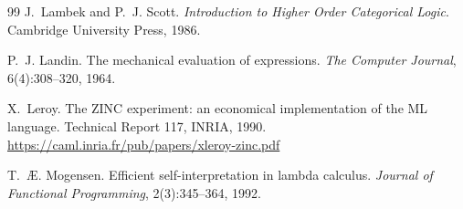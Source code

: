 \documentclass[11pt,a4paper]{article}
\theoremstyle{definition}
\theoremstyle{plain}
\begin{document}
\begin{thebibliography}{99}
J.~Lambek and P.~J. Scott.
\newblock \emph{Introduction to Higher Order Categorical Logic}.
\newblock Cambridge University Press, 1986.

P.~J. Landin.
\newblock The mechanical evaluation of expressions.
\newblock \emph{The Computer Journal}, 6(4):308--320, 1964.

X.~Leroy.
\newblock The {ZINC} experiment: an economical implementation of the {ML}
  language.
\newblock Technical Report 117, INRIA, 1990.
\newblock \url{https://caml.inria.fr/pub/papers/xleroy-zinc.pdf}

T.~{\AE}. Mogensen.
\newblock Efficient self-interpretation in lambda calculus.
\newblock \emph{Journal of Functional Programming}, 2(3):345--364, 1992.

\end{thebibliography}
\end{document}
